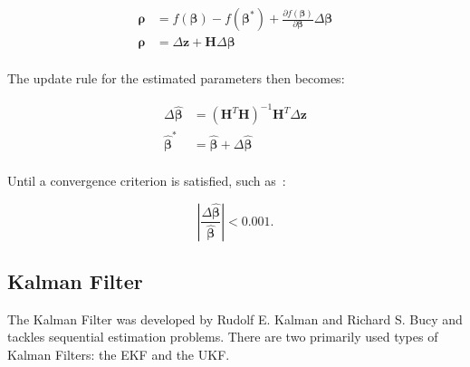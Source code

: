 \begin{equation}
    \begin{aligned}
        \bm{\rho} &= f(\bm{\beta}) - f(\bm{\beta}^*)  + \frac{\partial{f(\bm{\beta})}}{\partial{\bm{\beta}}}\Delta\bm{\beta}  \\
        \bm{\rho} &= \Delta\bm{z}  + \bm{H}\Delta\bm{\beta}  \\
    \end{aligned}
\end{equation}

The update rule for the estimated parameters then becomes:

\begin{equation}
    \begin{aligned}
        \Delta\hat{\bm{\beta}} &= (\bm{H}^T\bm{H})^{-1}\bm{H}^T\Delta\bm{z}  \\
        \hat{\bm{\beta}}^*     &= \hat{\bm{\beta}} + \Delta\hat{\bm{\beta}}  \\
    \end{aligned}
\end{equation}

Until a convergence criterion is satisfied, such as~\cite{Kelley1999}:

\begin{equation}
    \left|\frac {\Delta\hat{\bm{\beta}}}{\hat{\bm{\beta}}}\right|<0.001.
\end{equation}



\subsection{Kalman Filter}

The Kalman Filter was developed by Rudolf E. Kalman and Richard S. Bucy \cite{Kalman1960, Kalman1961} and tackles sequential estimation problems. There are two primarily used types of Kalman Filters: the \gls{EKF} and the \gls{UKF}. 

\def\predictstate{\vbox{
\begin{equation}
   \hat{\bm{x}}_{i|i-1} = \bm{\Phi}_i\,\hat{\bm{x}}_{i-1|i-1} + \bm{B}_i\,\bm{u}_{i}
\end{equation}
}}

\def\predictcovariance{\vbox{
\begin{equation}
   \bm{P}_{i|i-1} = \bm{\Phi}_i\bm{P}_{i-1|i-1}\bm{\Phi}_i^T+\bm{Q}_i
\end{equation}
}}

